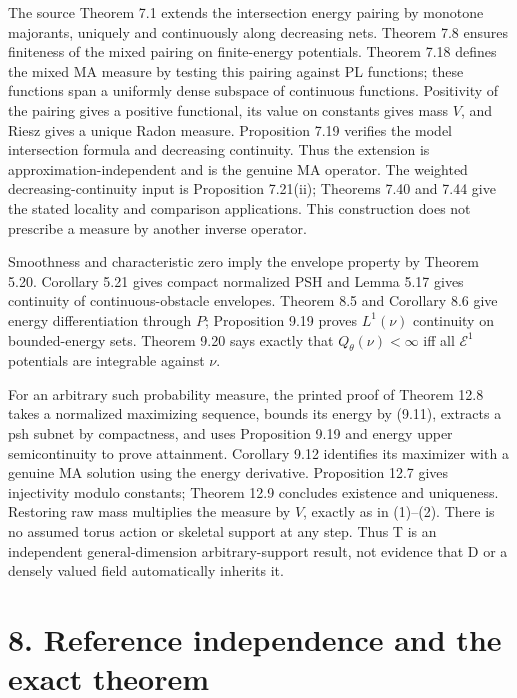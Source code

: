 \documentclass[11pt]{article}
\begin{document}
The source Theorem 7.1 extends the intersection energy pairing by monotone majorants, uniquely and continuously along decreasing nets. Theorem 7.8 ensures finiteness of the mixed pairing on finite-energy potentials. Theorem 7.18 defines the mixed MA measure by testing this pairing against PL functions; these functions span a uniformly dense subspace of continuous functions. Positivity of the pairing gives a positive functional, its value on constants gives mass \(V\), and Riesz gives a unique Radon measure. Proposition 7.19 verifies the model intersection formula and decreasing continuity. Thus the extension is approximation-independent and is the genuine MA operator. The weighted decreasing-continuity input is Proposition 7.21(ii); Theorems 7.40 and 7.44 give the stated locality and comparison applications. This construction does not prescribe a measure by another inverse operator.

Smoothness and characteristic zero imply the envelope property by Theorem 5.20. Corollary 5.21 gives compact normalized PSH and Lemma 5.17 gives continuity of continuous-obstacle envelopes. Theorem 8.5 and Corollary 8.6 give energy differentiation through \(P\); Proposition 9.19 proves \(L^1(\nu)\) continuity on bounded-energy sets. Theorem 9.20 says exactly that \(Q_\theta(\nu)<\infty\) iff all \(\mathcal E^1\) potentials are integrable against \(\nu\).

For an arbitrary such probability measure, the printed proof of Theorem 12.8 takes a normalized maximizing sequence, bounds its energy by (9.11), extracts a psh subnet by compactness, and uses Proposition 9.19 and energy upper semicontinuity to prove attainment. Corollary 9.12 identifies its maximizer with a genuine MA solution using the energy derivative. Proposition 12.7 gives injectivity modulo constants; Theorem 12.9 concludes existence and uniqueness. Restoring raw mass multiplies the measure by \(V\), exactly as in (1)--(2). There is no assumed torus action or skeletal support at any step. Thus T is an independent general-dimension arbitrary-support result, not evidence that D or a densely valued field automatically inherits it.

\section*{8. Reference independence and the exact theorem}
\end{document}
